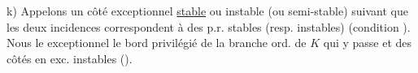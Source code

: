 k) Appelons un côté exceptionnel \uline{stable} ou instable (ou semi-stable) suivant que les deux   incidences correspondent à des p.r. stables (resp. instables) (condition   ). Nous  le  exceptionnel le bord privilégié de la branche ord. de \(K\) qui y passe et des côtés en  exc. instables ().
